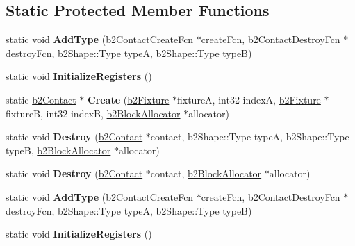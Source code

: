 \subsection*{Static Protected Member Functions}
\begin{DoxyCompactItemize}
\item 
\mbox{\label{classb2Contact_ad905650aab96ead0434c2bb449e4129c}} 
static void {\bfseries Add\+Type} (b2\+Contact\+Create\+Fcn $\ast$create\+Fcn, b2\+Contact\+Destroy\+Fcn $\ast$destroy\+Fcn, b2\+Shape\+::\+Type typeA, b2\+Shape\+::\+Type typeB)
\item 
\mbox{\label{classb2Contact_ac77031d85c2e06d5cdc1f5c774f8f3fd}} 
static void {\bfseries Initialize\+Registers} ()
\item 
\mbox{\label{classb2Contact_a2de75f3569a0f962cf1e6e1b6384c0a1}} 
static \hyperlink{classb2Contact}{b2\+Contact} $\ast$ {\bfseries Create} (\hyperlink{classb2Fixture}{b2\+Fixture} $\ast$fixtureA, int32 indexA, \hyperlink{classb2Fixture}{b2\+Fixture} $\ast$fixtureB, int32 indexB, \hyperlink{classb2BlockAllocator}{b2\+Block\+Allocator} $\ast$allocator)
\item 
\mbox{\label{classb2Contact_a36c1f6767f212f2e4ddb4c4b2c7cdb75}} 
static void {\bfseries Destroy} (\hyperlink{classb2Contact}{b2\+Contact} $\ast$contact, b2\+Shape\+::\+Type typeA, b2\+Shape\+::\+Type typeB, \hyperlink{classb2BlockAllocator}{b2\+Block\+Allocator} $\ast$allocator)
\item 
\mbox{\label{classb2Contact_ab57797a25c2206edf1ad7c4dcd1cbca5}} 
static void {\bfseries Destroy} (\hyperlink{classb2Contact}{b2\+Contact} $\ast$contact, \hyperlink{classb2BlockAllocator}{b2\+Block\+Allocator} $\ast$allocator)
\item 
\mbox{\label{classb2Contact_ae8580ab841e216713216421833a11b3b}} 
static void {\bfseries Add\+Type} (b2\+Contact\+Create\+Fcn $\ast$create\+Fcn, b2\+Contact\+Destroy\+Fcn $\ast$destroy\+Fcn, b2\+Shape\+::\+Type typeA, b2\+Shape\+::\+Type typeB)
\item 
\mbox{\label{classb2Contact_a34838bc1364bbe142dfb028f3a417550}} 
static void {\bfseries Initialize\+Registers} ()

\end{DoxyCompactItemize}
